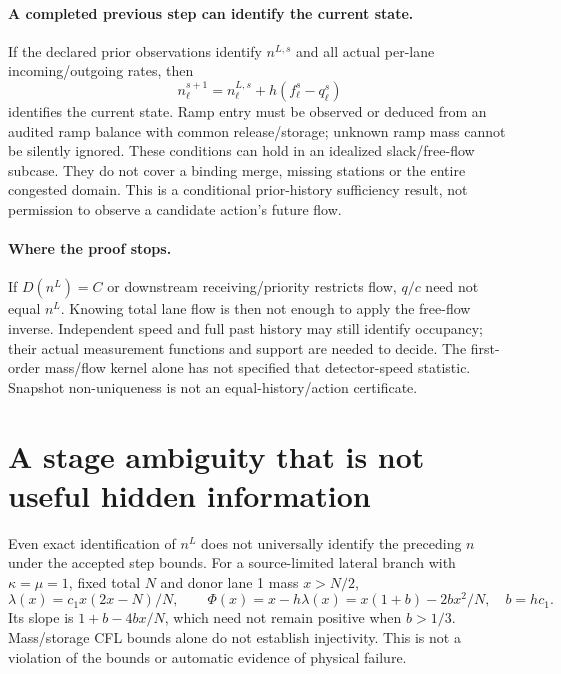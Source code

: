 \documentclass[10pt,a4paper]{article}
\begin{document}
\paragraph{A completed previous step can identify the current state.}
If the declared prior observations identify $n^{L,s}$ and all actual per-lane
incoming/outgoing rates, then
\begin{equation}
n_\ell^{s+1}=n_\ell^{L,s}+h(f_\ell^s-q_\ell^s)
\end{equation}
identifies the current state. Ramp entry must be observed or deduced from an
audited ramp balance with common release/storage; unknown ramp mass cannot be
silently ignored. These conditions can hold in an idealized slack/free-flow
subcase. They do not cover a binding merge, missing stations or the entire
congested domain. This is a conditional prior-history sufficiency result,
not permission to observe a candidate action's future flow.

\paragraph{Where the proof stops.}
If $D(n^L)=C$ or downstream receiving/priority restricts flow, $q/c$ need not
equal $n^L$. Knowing total lane flow is then not enough to apply the free-flow
inverse. Independent speed and full past history may still identify occupancy;
their actual measurement functions and support are needed to decide.
The first-order mass/flow kernel alone has not specified that detector-speed
statistic. Snapshot non-uniqueness is not an equal-history/action certificate.
\newpage

\section{A stage ambiguity that is not useful hidden information}
Even exact identification of $n^L$ does not universally identify the preceding
$n$ under the accepted step bounds. For a source-limited lateral branch with
$\kappa=\mu=1$, fixed total $N$ and donor lane 1 mass $x>N/2$,
\begin{equation}
\lambda(x)=c_1x(2x-N)/N,\qquad
\Phi(x)=x-h\lambda(x)=x(1+b)-2bx^2/N,\quad b=hc_1.
\end{equation}
Its slope is $1+b-4bx/N$, which need not remain positive when $b>1/3$.
Mass/storage CFL bounds alone do not establish injectivity. This is not a
violation of the bounds or automatic evidence of physical failure.
\end{document}
